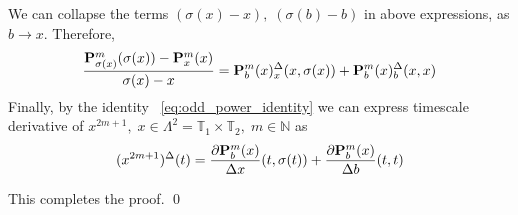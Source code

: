 We can collapse the terms $(\sigma(x) - x), \; (\sigma(b) - b)$ in above expressions, as $b\to x$.
Therefore,
\[
    \frac{{\mathbf{P}}\sp{m} \sb{\sigma(x)}(\sigma(x)) - {\mathbf{P}}\sp{m} \sb{x}(x)}{\sigma(x) - x}
    = {\mathbf{P}}\sp{m} \sb{b}(x)^{\Delta}_{x} (x, \sigma(x))
    + {\mathbf{P}}\sp{m} \sb{b}(x)^{\Delta}_{b} (x, x)
\]
Finally, by the identity ~\eqref{eq:odd_power_identity} we can express
timescale derivative of $x^{2m+1}, \; x\in \Lambda^2 = \mathbb{T}_1 \times \mathbb{T}_2, \; m\in\mathbb{N}$
as
\begin{equation*}
(x^{2m+1})
    ^{\Delta}(t)= \frac{\partial {\mathbf{P}}\sp{m} \sb{b}(x)}{\Delta x} (t, \sigma(t)) + \frac{\partial {\mathbf{P}}\sp{m} \sb{b}(x)}{\Delta b} (t, t)
\end{equation*}

This completes the proof. \qed
